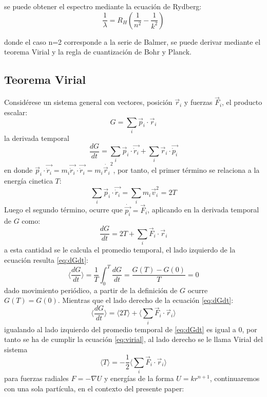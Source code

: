 \documentclass[a4paper,twocolumn,10pt]{article}
\newcommand{\braket}[1]{ \langle #1 \rangle }
\begin{document}
se puede obtener el espectro mediante la ecuación de Rydberg: 
\begin{equation}\label{eq:rydberginit}
     \frac{1}{\lambda} = R_H\left(\frac{1}{n^2}-\frac{1}{k^2}\right)
\end{equation}

donde el caso n=2 corresponde a la serie de Balmer, se puede derivar mediante el teorema Virial y la regla de cuantización de Bohr y Planck.

\subsection{Teorema Virial}
Considérese un sistema general con vectores, posición $\vec r_i$ y fuerzas $\vec F_i$, el producto escalar:
$$
G = \sum_i \vec p_i \cdot \vec r_i
$$
la derivada temporal
$$
\frac{dG}{dt} = \sum_i \vec p_i \cdot \vec{\dot r_i}
+ \sum_i \vec r_i \cdot \vec{\dot p_i}
$$
en donde $\vec p_i \cdot \vec{\dot r_i} = m_i \vec{\dot r_i} \cdot \vec{\dot r_i} = m_i \dot{\vec r_i}^2 $, por tanto, el primer término se relaciona a la energía cinetica $T$:
$$
\sum_i \vec p_i \cdot \vec{\dot r_i} = \sum_i m_i \vec v_i^2 = 2 T
$$
Luego el segundo término, ocurre que $\dot{\vec {p_i}} = \vec F_i$, aplicando en la derivada temporal de $G$ como:
\begin{equation}\label{eq:dGdt}
\frac{dG}{dt}  = 2T + \sum_i \vec F_i \cdot \vec r_i    
\end{equation}
a esta cantidad se le calcula el promedio temporal, el lado izquierdo de la ecuación resulta \ref{eq:dGdt}:
\begin{equation}
\braket{\frac{dG}{dt}} = \frac{1}{T} \int_0^T \frac{dG}{dt} =
\frac{G(T) - G(0)}{T} = 0
\end{equation}
dado movimiento periódico, a partir de la definición de $G$ ocurre $G(T) = G(0)$.
Mientras que el lado derecho de la ecuación \ref{eq:dGdt}:
\begin{equation}
\braket{ \frac{dG}{dt} } = \braket{ 2T } 
    + \braket{ \sum_i \vec F_i \cdot \vec r_i }
\end{equation}
igualando al lado izquierdo del promedio temporal de \ref{eq:dGdt} es igual a 0, por tanto se ha de cumplir la ecuación \ref{eq:virial}, al lado derecho se le llama Virial del sistema
\begin{equation}\label{eq:virial}
    \braket{T} = - \frac{1}{2}\braket{ \sum_i \vec F_i \cdot \vec r_i  }
\end{equation}
para fuerzas radiales $F = - \nabla U$ y energías de la forma $U = k r^{n+1}$, continuaremos con una sola partícula, en el contexto del presente paper:
\end{document}
